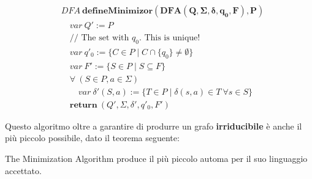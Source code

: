 \begin{align*}
& DFA \ \mathbf{defineMinimizor(DFA(Q,\Sigma,\delta,q_0,F), P)}             \\
& \quad var \ Q' := P                                                       \\
& \quad \text{// The set with } q_0 \text{. This is unique!}                \\
& \quad var \ q'_0 := \{C \in P \mid C \cap \{q_0\} \neq \emptyset\}        \\
& \quad var \ F' := \{S \in P \mid S \subseteq F\}                          \\
& \quad \forall \ (S \in P, a \in \Sigma)                                   \\
& \qquad var \ \delta'(S,a):=\{T\in P\mid\delta(s,a)\in T\ \forall s\in S\} \\
& \quad \mathbf{return} \ (Q',\Sigma,\delta',q'_0,F')
\end{align*}

Questo algoritmo oltre a garantire di produrre un grafo \textbf{irriducibile} è
anche il più piccolo possibile, dato il teorema seguente:

\begin{theorem}
The Minimization Algorithm produce il più piccolo automa per il suo
linguaggio accettato.
\end{theorem}
